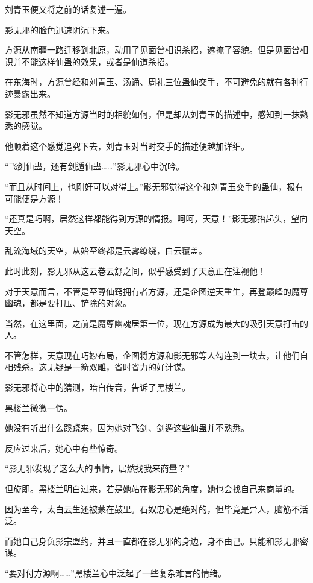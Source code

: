
\begin{this_body}

刘青玉便又将之前的话复述一遍。

影无邪的脸色迅速阴沉下来。

方源从南疆一路迁移到北原，动用了见面曾相识杀招，遮掩了容貌。但是见面曾相识并不能这样仙蛊的效果，或者是仙道杀招。

在东海时，方源曾经和刘青玉、汤诵、周礼三位蛊仙交手，不可避免的就有各种行迹暴露出来。

影无邪虽然不知道方源当时的相貌如何，但是却从刘青玉的描述中，感知到一抹熟悉的感觉。

他顺着这个感觉追究下去，刘青玉对当时交手的描述便越加详细。

“飞剑仙蛊，还有剑遁仙蛊……”影无邪心中沉吟。

“而且从时间上，也刚好可以对得上。”影无邪觉得这个和刘青玉交手的蛊仙，极有可能便是方源！

“还真是巧啊，居然这样都能得到方源的情报。呵呵，天意！”影无邪抬起头，望向天空。

乱流海域的天空，从始至终都是云雾缭绕，白云覆盖。

此时此刻，影无邪从这云卷云舒之间，似乎感受到了天意正在注视他！

对于天意而言，不管是至尊仙窍拥有者方源，还是企图逆天重生，再登巅峰的魔尊幽魂，都是要打压、铲除的对象。

当然，在这里面，之前是魔尊幽魂居第一位，现在方源成为最大的吸引天意打击的人。

不管怎样，天意现在巧妙布局，企图将方源和影无邪等人勾连到一块去，让他们自相残杀。这无疑是一箭双雕，省时省力的好计谋。

影无邪将心中的猜测，暗自传音，告诉了黑楼兰。

黑楼兰微微一愣。

她没有听出什么蹊跷来，因为她对飞剑、剑遁这些仙蛊并不熟悉。

反应过来后，她心中有些惊奇。

“影无邪发现了这么大的事情，居然找我来商量？”

但旋即。黑楼兰明白过来，若是她站在影无邪的角度，她也会找自己来商量的。

因为至今，太白云生还被蒙在鼓里。石奴忠心是绝对的，但毕竟是异人，脑筋不活泛。

而她自己身负影宗盟约，并且一直都在影无邪的身边，身不由己。只能和影无邪密谋。

“要对付方源啊……”黑楼兰心中泛起了一些复杂难言的情绪。


\end{this_body}
